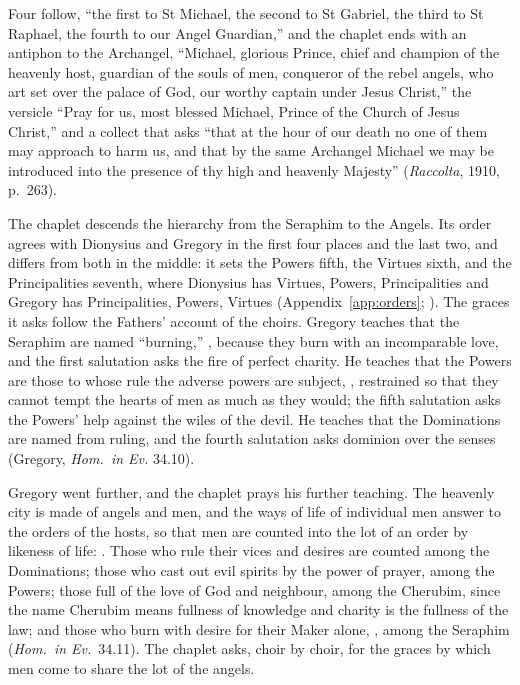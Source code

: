 \endgroup
Four  follow, ``the first to St Michael, the second to St
Gabriel, the third to St Raphael, the fourth to our Angel Guardian,'' and
the chaplet ends with an antiphon to the Archangel, ``Michael, glorious
Prince, chief and champion of the heavenly host, guardian of the souls of
men, conqueror of the rebel angels, who art set over the palace of God,
our worthy captain under Jesus Christ,'' the versicle ``Pray for us, most
blessed Michael, Prince of the Church of Jesus Christ,'' and a collect
that asks ``that at the hour of our death no one of them may approach to
harm us, and that by the same Archangel Michael we may be introduced into
the presence of thy high and heavenly Majesty'' (\emph{Raccolta}, 1910,
p.~263).

The chaplet descends the hierarchy from the Seraphim to the Angels. Its
order agrees with Dionysius and Gregory in the first four places and the
last two, and differs from both in the middle: it sets the Powers fifth,
the Virtues sixth, and the Principalities seventh, where Dionysius has
Virtues, Powers, Principalities and Gregory has Principalities, Powers,
Virtues (Appendix~\ref{app:orders}; ). The graces it asks
follow the Fathers' account of the choirs. Gregory teaches that the
Seraphim are named ``burning,'' , because
they burn with an incomparable love, and the first salutation asks the fire
of perfect charity. He teaches that the Powers are those to whose rule the
adverse powers are subject, , restrained so that
they cannot tempt the hearts of men as much as they would; the fifth
salutation asks the Powers' help against the wiles of the devil. He
teaches that the Dominations are named from ruling, and the fourth
salutation asks dominion over the senses (Gregory, \emph{Hom.\ in Ev.}
34.10).

Gregory went further, and the chaplet prays his further teaching. The
heavenly city is made of angels and men, and the ways of life of
individual men answer to the orders of the hosts, so that men are counted
into the lot of an order by likeness of life: . Those who
rule their vices and desires are counted among the Dominations; those who
cast out evil spirits by the power of prayer, among the Powers; those
full of the love of God and neighbour, among the Cherubim, since the name
Cherubim means fullness of knowledge and charity is the fullness of the
law; and those who burn with desire for their Maker alone, , among the Seraphim (\emph{Hom.\ in Ev.}\ 34.11). The chaplet asks, choir by choir, for the graces by
which men come to share the lot of the angels.

